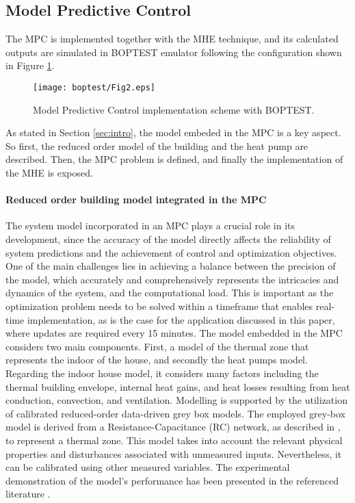\subsection{Model Predictive Control}
\label{sec:MPC}
The MPC is implemented together with the MHE technique, and its calculated outputs are simulated in BOPTEST emulator following the configuration shown in Figure \ref{fig:2}.

\begin{figure}
  \texttt{[image: boptest/Fig2.eps]}
\caption{Model Predictive Control implementation scheme with BOPTEST.}
\label{fig:2}       %
\end{figure}
%

As stated in Section \ref{sec:intro}, the model embeded in the MPC is a key aspect. So first, the reduced order model of the building and the heat pump are described. Then, the MPC problem is defined, and finally the implementation of the MHE is exposed.

\paragraph{Reduced order building model integrated in the MPC} 

The system model incorporated in an MPC plays a crucial role in its development, since the accuracy of the model directly affects the reliability of system predictions and the achievement of control and optimization objectives. One of the main challenges lies in achieving a balance between the precision of the model, which accurately and comprehensively represents the intricacies and dynamics of the system, and the computational load. This is important as the optimization problem needs to be solved within a timeframe that enables real-time implementation, as is the case for the application discussed in this paper, where updates are required every 15 minutes.
The model embedded in the MPC considers two main components. First, a model of the thermal zone that represents the indoor of the house, and secondly the heat pumps model.
Regarding the indoor house model, it considers many factors including the thermal building envelope, internal heat gains, and heat losses resulting from heat conduction, convection, and ventilation. Modelling is supported by the utilization of calibrated reduced-order data-driven grey box models. The employed grey-box model is derived from a Resistance-Capacitance (RC) network, as described in \cite{Kim2018_2}, to represent a thermal zone. This model takes into account the relevant physical properties and disturbances associated with unmeasured inputs. Nevertheless, it can be calibrated using other measured variables. The experimental demonstration of the model's performance has been presented in the referenced literature \cite{Kim2016}.

